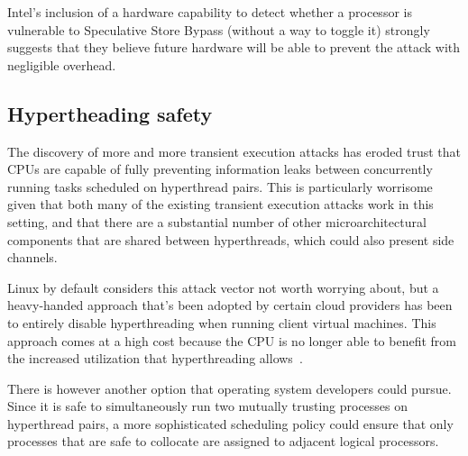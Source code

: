 Intel's inclusion of a hardware capability to detect whether a
processor is vulnerable to Speculative Store Bypass (without a way to toggle it) strongly
suggests that they believe future hardware will be able to prevent
the attack with negligible overhead.

\subsection{Hypertheading safety}

The discovery of more and more transient execution attacks has eroded trust that CPUs are capable of fully preventing information leaks between concurrently running tasks scheduled on hyperthread pairs.
This is particularly worrisome given that both many of the existing transient execution attacks work in this setting, and that there are a substantial number of other microarchitectural components that are shared between hyperthreads, which could also present side channels.

Linux by default considers this attack vector not worth worrying about, but a heavy-handed approach that's been adopted by certain cloud providers has been to entirely disable hyperthreading when running client virtual machines.
This approach comes at a high cost because the CPU is no longer able to benefit
from the increased utilization that hyperthreading allows~\cite{intelht}.

There is however another option that operating system developers could pursue.
Since it is safe to simultaneously run two mutually trusting processes
on hyperthread pairs, a more sophisticated scheduling policy could
ensure that only processes that are safe to collocate
are assigned to adjacent logical processors.

